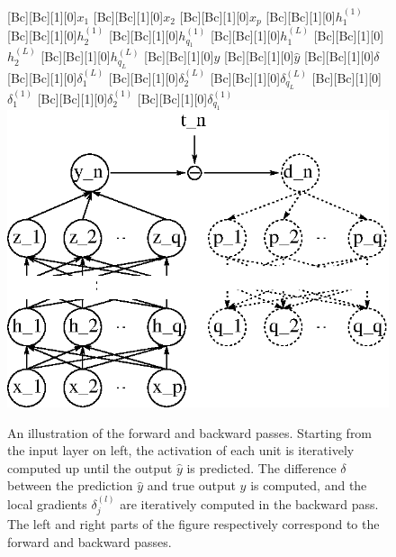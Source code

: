\documentclass{now}
\begin{document}
\begin{figure}[t]
    \centering
    [Bc][Bc][1][0]{$x_1$}
    [Bc][Bc][1][0]{$x_2$}
    [Bc][Bc][1][0]{$x_p$}
    [Bc][Bc][1][0]{$h^{(1)}_1$}
    [Bc][Bc][1][0]{$h^{(1)}_2$}
    [Bc][Bc][1][0]{$h^{(1)}_{q_1}$}
    [Bc][Bc][1][0]{$h^{(L)}_1$}
    [Bc][Bc][1][0]{$h^{(L)}_2$}
    [Bc][Bc][1][0]{$h^{(L)}_{q_L}$}
    [Bc][Bc][1][0]{$y$}
    [Bc][Bc][1][0]{$\hat{y}$}
    [Bc][Bc][1][0]{$\delta$}
    [Bc][Bc][1][0]{$\delta^{(L)}_1$}
    [Bc][Bc][1][0]{$\delta^{(L)}_2$}
    [Bc][Bc][1][0]{$\delta^{(L)}_{q_L}$}
    [Bc][Bc][1][0]{$\delta^{(1)}_1$}
    [Bc][Bc][1][0]{$\delta^{(1)}_2$}
    [Bc][Bc][1][0]{$\delta^{(1)}_{q_1}$}
    \includegraphics[width=0.75\columnwidth]{../figures/mlp_bp.eps}
    \caption{An illustration of the forward and
    backward passes. Starting from the input layer on left,
    the activation of each unit is iteratively computed up
    until the output $\hat{y}$ is predicted. The difference
    $\delta$ between the prediction $\hat{y}$ and true
    output $y$ is computed, and the local gradients
    $\delta_j^{(l)}$ are iteratively computed in the
    backward pass. The left and right parts of the figure
    respectively correspond to the forward and backward
    passes.}
    \label{fig:backprop}
\end{figure}

\end{document}
